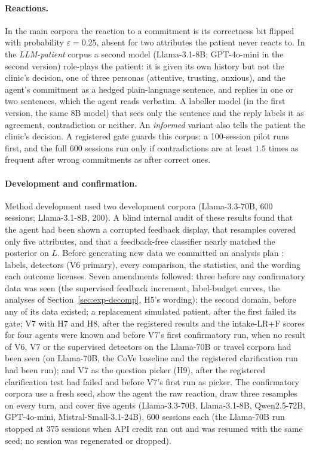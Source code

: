 \documentclass[10pt,a4paper,twocolumn]{article}
\begin{document}
\paragraph{Reactions.} In the main corpora the reaction to a commitment is
its correctness bit flipped with probability $\varepsilon=0.25$, absent for
two attributes the patient never reacts to. In the \emph{LLM-patient}
corpus a second model (Llama-3.1-8B; GPT-4o-mini in the second version) role-plays the patient: it is given
its own history but not the clinic's decision, one of three personas
(attentive, trusting, anxious), and the agent's commitment as a hedged
plain-language sentence, and replies in one or two sentences, which the
agent reads verbatim. A labeller model (in the first version, the same 8B
model) that sees only the sentence and the reply labels it as agreement,
contradiction or neither.
An \emph{informed} variant also tells the patient the clinic's decision.
A registered gate guards this corpus: a 100-session pilot runs first, and
the full 600 sessions run only if contradictions are at least $1.5$ times as
frequent after wrong commitments as after correct ones.

\paragraph{Development and confirmation.} Method development used two
development corpora (Llama-3.3-70B, 600 sessions; Llama-3.1-8B, 200). A
blind internal audit of these results found that the agent had been shown a
corrupted feedback display, that resamples covered only five attributes,
and that a feedback-free classifier nearly matched the posterior on $L$.
Before generating new data we committed an analysis plan
\citep{nosek2018preregistration}: labels, detectors (V6 primary), every
comparison, the statistics, and the wording each outcome licenses. Seven
amendments followed: three before any confirmatory data was seen (the
supervised feedback increment, label-budget curves, the analyses of
Section~\ref{sec:exp-decomp}, H5's wording); the second domain, before any
of its data existed; a replacement simulated patient, after the first
failed its gate; V7 with H7 and H8, after the registered results and the
intake-LR+F scores for four agents were known and before V7's first
confirmatory run, when no result of V6, V7 or the supervised detectors on
the Llama-70B or travel corpora had been seen (on Llama-70B, the CoVe
baseline and the registered clarification run had been run); and V7 as the
question picker (H9), after the registered clarification test had failed
and before V7's first run as picker. The confirmatory
corpora use a fresh seed, show the agent the raw reaction, draw three
resamples on every turn, and cover five agents (Llama-3.3-70B,
Llama-3.1-8B, Qwen2.5-72B, GPT-4o-mini, Mistral-Small-3.1-24B), 600
sessions each (the Llama-70B run stopped at 375 sessions when API credit ran
out and was resumed with the same seed; no session was regenerated or
dropped).
\end{document}
